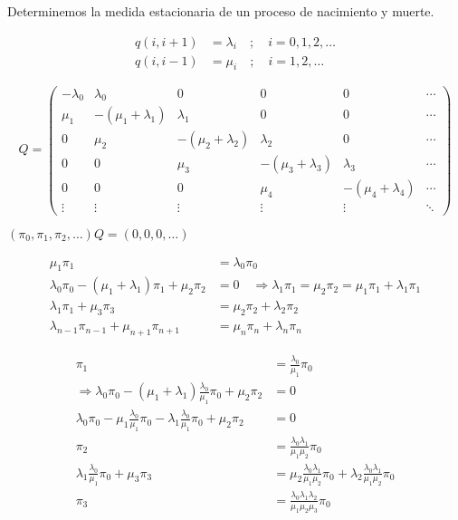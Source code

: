 \documentclass[12pt,a4paper]{article}
\begin{document}

Determinemos la medida estacionaria de un proceso de nacimiento y muerte.

\begin{align*}
q(i, i+1) &= \lambda_i \quad ; \quad i = 0, 1, 2, \ldots \\
q(i, i-1) &= \mu_i \quad ; \quad i = 1, 2, \ldots
\end{align*}

\begin{equation*}
Q = \begin{pmatrix}
-\lambda_0 & \lambda_0 & 0 & 0 & 0 & \cdots \\
\mu_1 & -(\mu_1 + \lambda_1) & \lambda_1 & 0 & 0 & \cdots \\
0 & \mu_2 & -(\mu_2 + \lambda_2) & \lambda_2 & 0 & \cdots \\
0 & 0 & \mu_3 & -(\mu_3 + \lambda_3) & \lambda_3 & \cdots \\
0 & 0 & 0 & \mu_4 & -(\mu_4 + \lambda_4) & \cdots \\
\vdots & \vdots & \vdots & \vdots & \vdots & \ddots
\end{pmatrix}
\end{equation*}


$(\pi_0, \pi_1, \pi_2, \ldots) Q = (0, 0, 0, \ldots)$

\begin{align*}
\mu_1 \pi_1 &= \lambda_0 \pi_0 \\
\lambda_0 \pi_0 - (\mu_1 + \lambda_1) \pi_1 + \mu_2 \pi_2 &= 0 \quad \Rightarrow \lambda_1 \pi_1 = \mu_2 \pi_2 = \mu_1 \pi_1 + \lambda_1 \pi_1 \\
\lambda_1 \pi_1 + \mu_3 \pi_3 &= \mu_2 \pi_2 + \lambda_2 \pi_2 \\
\lambda_{n-1} \pi_{n-1} + \mu_{n+1} \pi_{n+1} &= \mu_n \pi_n + \lambda_n \pi_n
\end{align*}

\begin{align*}
\pi_1 &= \frac{\lambda_0}{\mu_1} \pi_0 \\
\Rightarrow \lambda_0 \pi_0 - (\mu_1 + \lambda_1) \frac{\lambda_0}{\mu_1} \pi_0 + \mu_2 \pi_2 &= 0 \\
\lambda_0 \pi_0 - \mu_1 \frac{\lambda_0}{\mu_1} \pi_0 - \lambda_1 \frac{\lambda_0}{\mu_1} \pi_0 + \mu_2 \pi_2 &= 0 \\
\pi_2 &= \frac{\lambda_0 \lambda_1}{\mu_1 \mu_2} \pi_0 \\
\lambda_1 \frac{\lambda_0}{\mu_1} \pi_0 + \mu_3 \pi_3 &= \mu_2 \frac{\lambda_0 \lambda_1}{\mu_1 \mu_2} \pi_0 + \lambda_2 \frac{\lambda_0 \lambda_1}{\mu_1 \mu_2} \pi_0 \\
\pi_3 &= \frac{\lambda_0 \lambda_1 \lambda_2}{\mu_1 \mu_2 \mu_3} \pi_0
\end{align*}
\end{document}
